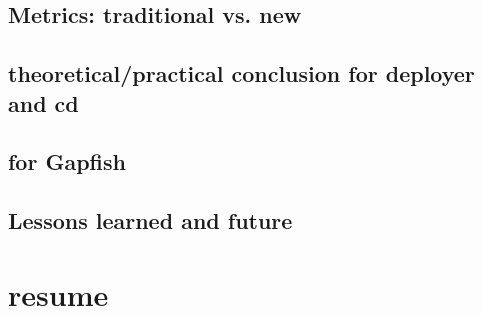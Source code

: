 \section{Metrics: traditional vs. new}
\section{theoretical/practical conclusion for deployer and cd}
\section{for Gapfish}
\section{Lessons learned and future}

\chapter{resume}
